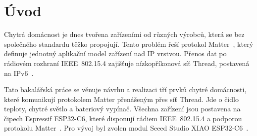 \chapter*{Úvod}
{}


Chytrá domácnost je dnes tvořena zařízeními od různých výrobců, která se bez
společného standardu těžko propojují. Tento problém řeší protokol
Matter~\cite{csa-matter}, který definuje jednotný aplikační model zařízení
nad IP vrstvou. Přenos dat po rádiovém rozhraní IEEE~802.15.4 zajišťuje
nízkopříkonová síť Thread, postavená na IPv6~\cite{thread-group}.

Tato bakalářská práce se věnuje návrhu a realizaci tří prvků chytré domácnosti,
které komunikují protokolem Matter přenášeným přes síť Thread. Jde o čidlo
teploty, chytré světlo a bateriový vypínač. Všechna zařízení jsou postavena
na čipech Espressif ESP32-C6, které disponují rádiem IEEE~802.15.4 a podporou
protokolu Matter~\cite{espressif-esp32c6-ds}. Pro vývoj byl zvolen modul
Seeed Studio XIAO ESP32-C6~\cite{seeed-xiao-wiki}.